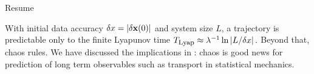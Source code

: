 {%
%
%

      }%


Resume


\noindent
With initial data accuracy $\delta x = |\delta {\bf x}(0)| $
and system size $L$, a trajectory is predictable only to the
finite Lyapunov time
$
T_{\mbox{\footnotesize Lyap}} \approx {\ensuremath{\lambda}}^{-1}\ln {|L / \delta x|}
\,.
$ %
Beyond that, chaos rules. We have discussed the implications
in : chaos is good news for prediction of
long term observables such as transport in
statistical mechanics.

